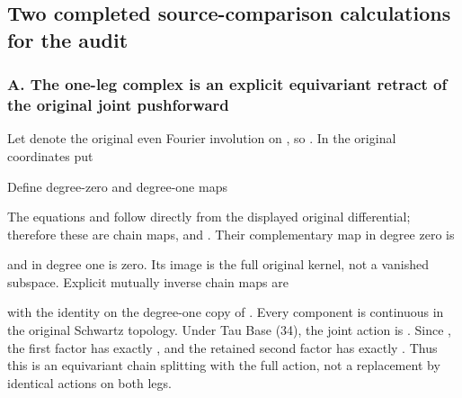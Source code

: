 \subsection{Two completed source-comparison calculations for the
audit}\label{TranscriptLedgerStage:two-completed-source-comparison-calculations-for-the-audit}

\subsubsection{A. The one-leg complex is an explicit equivariant retract
of the original joint
pushforward}\label{TranscriptLedgerStage:a.-the-one-leg-complex-is-an-explicit-equivariant-retract-of-the-original-joint-pushforward}

Let \protect{} denote the original even Fourier involution on
\protect{}, so \protect{}. In the original coordinates
put


Define degree-zero and degree-one maps


The equations \protect{} and
\protect{} follow directly from the displayed
original differential; therefore these are chain maps, and
\protect{}. Their complementary map in degree zero is


and in degree one is zero. Its image is the full original kernel, not a
vanished subspace. Explicit mutually inverse chain maps are



with the identity on the degree-one copy of \protect{}.
Every component is continuous in the original Schwartz topology. Under
Tau Base (34), the joint action is \protect{}.
Since \protect{}, the first
factor has exactly \protect{}, and the retained second factor
has exactly \protect{}. Thus this is an equivariant chain
splitting with the full action, not a replacement by identical actions
on both legs.

